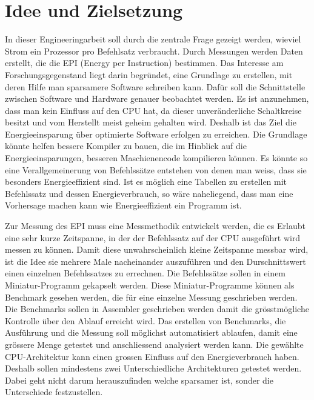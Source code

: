 \chapter{Idee und Zielsetzung}



In dieser Engineeringarbeit soll durch die zentrale Frage gezeigt werden, wieviel Strom ein Prozessor pro Befehlsatz verbraucht. Durch Messungen werden Daten erstellt, die die EPI (Energy per Instruction) bestimmen. Das Interesse am Forschungsgegenstand liegt darin begründet, eine Grundlage zu erstellen, mit deren Hilfe man sparsamere Software schreiben kann. Dafür soll die Schnittstelle zwischen Software und Hardware genauer beobachtet werden. Es ist anzunehmen, dass man kein Einfluss auf den CPU hat, da dieser unveränderliche Schaltkreise besitzt und vom Herstellt meist geheim gehalten wird. Deshalb ist das Ziel die Energieeinsparung über optimierte Software erfolgen zu erreichen. Die Grundlage könnte helfen bessere Kompiler zu bauen, die im Hinblick auf die Energieeinsparungen, besseren Maschienencode kompilieren können. Es könnte so eine Verallgemeinerung von Befehlssätze entstehen von denen man weiss, dass sie besonders Energieeffizient sind. Ist es möglich eine Tabellen zu erstellen mit Befehlssatz und dessen Energieverbrauch, so wäre naheliegend, dass man eine Vorhersage machen kann wie Energieeffizient ein Programm ist.  
\par
Zur Messung des EPI muss eine Messmethodik entwickelt werden, die es Erlaubt eine sehr kurze Zeitspanne, in der der Befehlssatz auf der CPU ausgeführt wird messen zu können. Damit diese unwahrscheinlich kleine Zeitspanne messbar wird, ist die Idee sie mehrere Male nacheinander auszuführen und den Durschnittswert einen einzelnen Befehlssatzes zu errechnen. Die Befehlssätze sollen in einem Miniatur-Programm gekapselt werden. Diese Miniatur-Programme können als Benchmark gesehen werden, die für eine einzelne Messung geschrieben werden. Die Benchmarks sollen in Assembler geschrieben werden damit die grösstmögliche Kontrolle über den Ablauf erreicht wird. Das erstellen von Benchmarks, die Ausführung und die Messung soll möglichst automatisiert ablaufen, damit eine grössere Menge getestet und anschliessend analysiert werden kann. Die gewählte CPU-Architektur kann einen grossen Einfluss auf den Energieverbrauch haben. Deshalb sollen mindestens zwei Unterschiedliche Architekturen getestet werden. Dabei geht nicht darum herauszufinden welche sparsamer ist, sonder die Unterschiede festzustellen.

